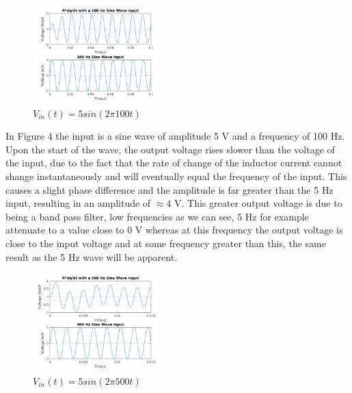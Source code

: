 \documentclass[11pt,a4paper]{article}
\begin{document}
\begin{figure}
    \vspace{-15mm}
  		\includegraphics[width=0.45\textwidth]{Ex3_Figs/100Sine.png}
	\vspace{-6mm}
  	\caption{$V_{in}(t)= 5sin(2 \pi 100t)$}
  	\label{fig:ex3g3}
\end{figure}

\vspace{6mm}In Figure 4 the input is a sine wave of amplitude 5 V and a frequency of 100 Hz. Upon the start of the wave, the output voltage rises slower than the voltage of the input, due to the fact that the rate of change of the inductor current cannot shange instantaneously and will eventually equal the frequency of the input. This causes a slight phase difference and the amplitude is far greater than the 5 Hz input, resulting in an amplitude of $\approx 4$ V. This greater output voltage is due to being a band pass filter, low frequencies as we can see, 5 Hz for example attenuate to a value close to 0 V whereas at this frequency the output voltage is close to the input voltage and at some frequency greater than this, the same result as the 5 Hz wave will be apparent.

\begin{figure}
    \vspace{-33mm}
  		\includegraphics[width=0.45\textwidth]{Ex3_Figs/500Sine.png}
	\vspace{-6mm}
  	\caption{$V_{in}(t)= 5sin(2 \pi 500t)$}
  	\label{fig:ex3g4}
\end{figure}
\end{document}
